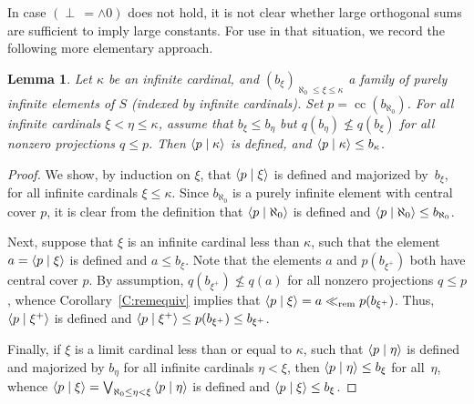 \documentclass[psamsfonts,reqno]{memo-l}
\theoremstyle{plain}
\newtheorem{lemma}{Lemma}[section]
\theoremstyle{definition}
\theoremstyle{remark}
\numberwithin{equation}{section}
\newcommand{\rem}{\ll_{\mathrm{rem}}}
\newcommand{\scal}[2]{\left\langle\nobreak#1\nobreak\mid\nobreak#2
\nobreak\right\rangle}
\newcommand{\pup}[1]{\textup{(}{#1}\textup{)}}
\DeclareMathOperator{\cc}{cc}
\newcommand{\famm}[2]{(#1)_{#2}}
\begin{document}
In case $(\perp\,=\wedge0)$ does not hold, it is not clear whether large
orthogonal sums are sufficient to imply large constants. For use in that
situation, we record the following more elementary approach.

\begin{lemma}\label{L:buildpkappa}
Let $\kappa$ be an infinite cardinal, and
$\famm{b_\xi}{\aleph_0\leq\xi\leq\kappa}$ a family of purely infinite
elements of $S$ \pup{indexed by infinite cardinals}.
Set $p=\cc(b_{\aleph_0})$. For all infinite cardinals
$\xi<\eta\leq\kappa$, assume that $b_\xi\leq b_\eta$ but $q(b_\eta)
\nleq q(b_\xi)$ for all nonzero projections $q\leq p$. Then
$\scal{p}{\kappa}$ is defined, and $\scal{p}{\kappa}\leq b_\kappa$.
\end{lemma}

\begin{proof} We show, by induction on $\xi$, that $\scal{p}{\xi}$
is defined and majorized by~$b_\xi$, for all infinite cardinals
$\xi\leq\kappa$. Since $b_{\aleph_0}$ is a purely infinite element
with central cover $p$, it is clear from the definition that
$\scal{p}{\aleph_0}$ is defined and
$\scal{p}{\aleph_0}\leq\nobreak b_{\aleph_0}$.

Next, suppose that $\xi$ is an infinite cardinal less than $\kappa$,
such that the element $a=\scal{p}{\xi}$ is defined and $a\leq b_\xi$.
Note that the elements $a$ and $p(b_{\xi^+})$ both have central cover
$p$. By assumption, $q(b_{\xi^+}) \nleq q(a)$ for all nonzero
projections $q\leq p$, whence Corollary~\ref{C:remequiv} implies that
$\scal{p}{\xi}= a \rem p(b_{\xi^+})$. Thus, $\scal{p}{\xi^+}$
is defined and
$\scal{p}{\xi^+}\leq p(b_{\xi^+})\leq b_{\xi^+}$.

Finally, if $\xi$ is a limit cardinal less than or equal to $\kappa$,
such that $\scal{p}{\eta}$ is defined and majorized by $b_\eta$ for all
infinite cardinals $\eta<\xi$, then $\scal{p}{\eta} \leq b_\xi$ for
all~$\eta$, whence $\scal{p}{\xi}= \bigvee_{\aleph_0\leq\eta<\xi}
\scal{p}{\eta}$ is defined and $\scal{p}{\xi} \leq b_\xi$.
\end{proof}
\end{document}
